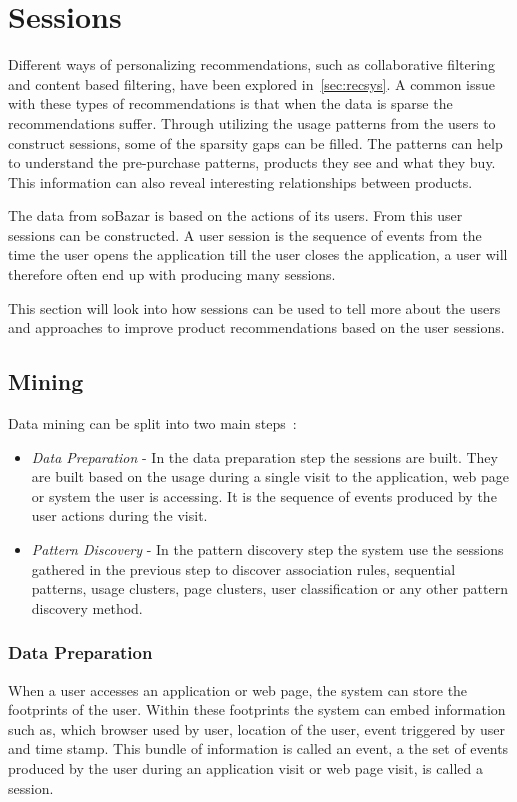 
\section{Sessions}


    Different ways of personalizing recommendations, such as collaborative filtering and content based filtering, have been explored in~\ref{sec:recsys}.
    A common issue with these types of recommendations is that when the data is sparse the recommendations suffer.
    Through utilizing the usage patterns from the users to construct sessions, some of the sparsity gaps can be filled.
    The patterns can help to understand the pre-purchase patterns, products they see and what they buy.
    This information can also reveal interesting relationships between products.

    The data from soBazar is based on the actions of its users.
    From this user sessions can be constructed.
    A user session is the sequence of events from the time the user opens the application till the user closes the application, a user will therefore often end up with producing many sessions.

    This section will look into how sessions can be used to tell more about the users and approaches to improve product recommendations based on the user sessions.

\subsection{Mining}
    Data mining can be split into two main steps~\cite{Cho2002329}:
    \begin{itemize}
        \item \emph{Data Preparation} - In the data preparation step the sessions are built. They are built based on the usage during a single visit to the application, web page or system the user is accessing. It is the sequence of events produced by the user actions during the visit.
        \item \emph{Pattern Discovery} - In the pattern discovery step the system use the sessions gathered in the previous step to discover association rules, sequential patterns, usage clusters, page clusters, user classification or any other pattern discovery method.
    \end{itemize}

\subsubsection{Data Preparation} %
    \label{par:Data_Preparation}
    When a user accesses an application or web page, the system can store the footprints of the user.
    Within these footprints the system can embed information such as, which browser used by user, location of the user, event triggered by user and time stamp.
    This bundle of information is called an event, a the set of events produced by the user during an application visit or web page visit, is called a session.

